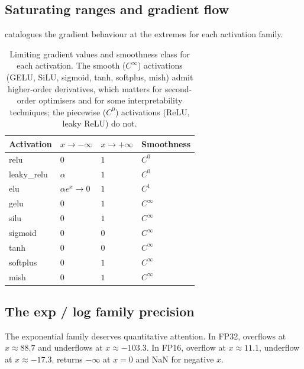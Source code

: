 \subsection{Saturating ranges and gradient flow}
\label{ssec:unary_functions:sat_ranges}

 catalogues the
gradient behaviour at the extremes for each activation family.

\begin{table}[t]
\centering
\small
\begin{tabular}{llll}
\toprule
Activation & $x \to -\infty$ & $x \to +\infty$ & Smoothness \\
\midrule
relu      & $0$              & $1$              & $C^0$ \\
leaky\_relu & $\alpha$       & $1$              & $C^0$ \\
elu       & $\alpha e^x \to 0$ & $1$            & $C^1$ \\
gelu      & $0$              & $1$              & $C^\infty$ \\
silu      & $0$              & $1$              & $C^\infty$ \\
sigmoid   & $0$              & $0$              & $C^\infty$ \\
tanh      & $0$              & $0$              & $C^\infty$ \\
softplus  & $0$              & $1$              & $C^\infty$ \\
mish      & $0$              & $1$              & $C^\infty$ \\
\bottomrule
\end{tabular}
\caption[Gradient behaviour at extremes.]{Limiting gradient values
and smoothness class for each activation. The smooth ($C^\infty$)
activations (GELU, SiLU, sigmoid, tanh, softplus, mish) admit
higher-order derivatives, which matters for second-order
optimisers and for some interpretability techniques; the piecewise
($C^0$) activations (ReLU, leaky ReLU) do not.}
\label{tab:unary_functions:activation_grad}
\end{table}

\subsection{The exp / log family precision}
\label{ssec:unary_functions:exp_log_prec}

The exponential family deserves quantitative attention. In FP32,
 overflows at $x \approx 88.7$ and underflows at $x
\approx -103.3$. In FP16, overflow at $x \approx 11.1$,
underflow at $x \approx -17.3$.  returns $-\infty$
at $x = 0$ and NaN for negative $x$.

